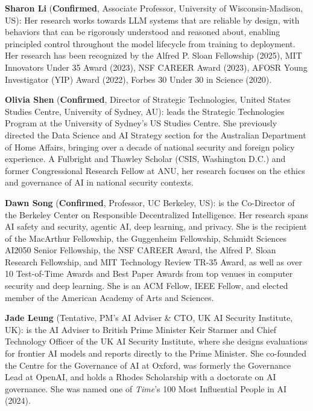 \documentclass{article}
\newcommand{\confirmed}{\textcolor{green!60!black}{\textbf{Confirmed}}}
\newcommand{\tentative}{\textcolor{orange!80!black}{Tentative}}
\begin{document}
\textbf{Sharon Li} (\confirmed, Associate Professor, University of Wisconsin-Madison, US): Her research works towards LLM systems that are reliable by design, with behaviors that can be rigorously understood and reasoned about, enabling principled control throughout the model lifecycle from training to deployment. Her research has been recognized by the Alfred P. Sloan Fellowship (2025), MIT Innovators Under 35 Award (2023), NSF CAREER Award (2023), AFOSR Young Investigator (YIP) Award (2022), Forbes 30 Under 30 in Science (2020).

\textbf{Olivia Shen} (\confirmed, Director of Strategic Technologies, United States Studies Centre, University of Sydney, AU): leads the Strategic Technologies Program at the University of Sydney’s US Studies Centre. She previously directed the Data Science and AI Strategy section for the Australian Department of Home Affairs, bringing over a decade of national security and foreign policy experience. A Fulbright and Thawley Scholar (CSIS, Washington D.C.) and former Congressional Research Fellow at ANU, her research focuses on the ethics and governance of AI in national security contexts.

\textbf{Dawn Song} (\confirmed, Professor, UC Berkeley, US): is the Co-Director of the Berkeley Center on Responsible Decentralized Intelligence. Her research spans AI safety and security, agentic AI, deep learning, and privacy. She is the recipient of the MacArthur Fellowship, the Guggenheim Fellowship, Schmidt Sciences AI2050 Senior Fellowship, the NSF CAREER Award, the Alfred P. Sloan Research Fellowship, and MIT Technology Review TR-35 Award, as well as over 10 Test-of-Time Awards and Best Paper Awards from top venues in computer security and deep learning. She is an ACM Fellow, IEEE Fellow, and elected member of the American Academy of Arts and Sciences.
    
\textbf{Jade Leung} (\tentative, PM’s AI Adviser \& CTO, UK AI Security Institute, UK): is the AI Adviser to British Prime Minister Keir Starmer and Chief Technology Officer of the UK AI Security Institute, where she designs evaluations for frontier AI models and reports directly to the Prime Minister. She co-founded the Centre for the Governance of AI at Oxford, was formerly the Governance Lead at OpenAI, and holds a Rhodes Scholarship with a doctorate on AI governance. She was named one of \textit{Time}’s 100 Most Influential People in AI (2024).
\end{document}
